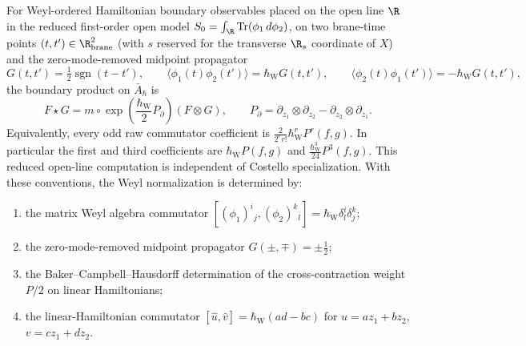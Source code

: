 \documentclass[11pt]{memoir}
\begin{document}
\begin{prop}\label{prop:boundary-product-normalization}
  For Weyl-ordered Hamiltonian boundary observables placed on the open line
  $\R$ in the reduced first-order open model
  $S_0=\int_\R\mathrm{Tr}(\phi_1\,d\phi_2)$, on two brane-time points
  $(t,t')\in\R^2_{\mathrm{brane}}$ (with $s$ reserved for the transverse
  $\R_s$ coordinate of $X$) and the zero-mode-removed midpoint
  propagator
  $$G(t,t')=\tfrac{1}{2}\operatorname{sgn}(t-t'),\qquad
    \langle\phi_1(t)\phi_2(t')\rangle=\hbar_{\mathrm{W}} G(t,t'),\qquad
    \langle\phi_2(t)\phi_1(t')\rangle=-\hbar_{\mathrm{W}} G(t,t'),$$
  the boundary product on $\bar A_\hbar$ is
  $$F\star G=m\circ\exp\!\left(\frac{\hbar_{\mathrm{W}}}{2}P_{\partial}\right)(F\otimes G),
    \qquad P_{\partial}=\partial_{z_1}\otimes\partial_{z_2}
      -\partial_{z_2}\otimes\partial_{z_1}.$$
  Equivalently, every odd raw commutator coefficient is
  $\frac{2}{2^r r!}\hbar_{\mathrm{W}}^r P^r(f,g)$. In particular the first and third
  coefficients are \(\hbar_{\mathrm{W}} P(f,g)\) and \(\frac{\hbar_{\mathrm{W}}^3}{24}P^3(f,g)\). This
  reduced open-line computation is independent of Costello specialization. With these
  conventions, the Weyl normalization is determined by:
  \begin{enumerate}
    \item the matrix Weyl algebra commutator
      $[(\phi_1)^i{}_j,(\phi_2)^k{}_l]=\hbar_{\mathrm{W}}\delta^i_l\delta^k_j$;
    \item the zero-mode-removed midpoint propagator
      $G(\pm,\mp)=\pm\tfrac12$;
    \item the Baker--Campbell--Hausdorff determination of the cross-contraction
      weight $P/2$ on linear Hamiltonians;
    \item the linear-Hamiltonian commutator
      $[\widehat u,\widehat v]=\hbar_{\mathrm{W}}(ad-bc)$ for $u=az_1+bz_2$,
      $v=cz_1+dz_2$.
  \end{enumerate}
\end{prop}
\end{document}

